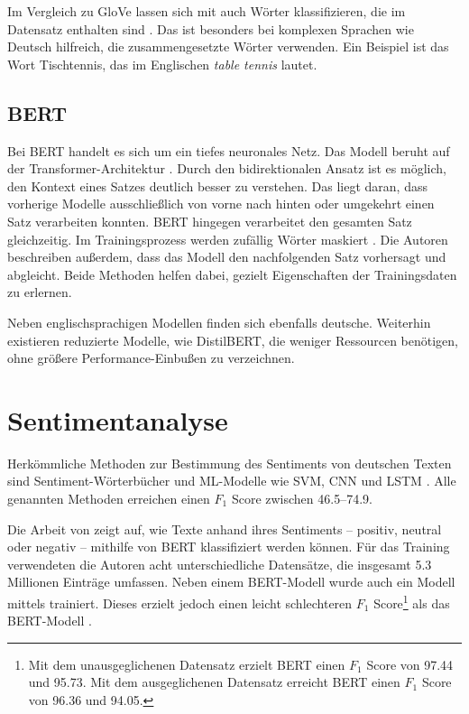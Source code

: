 Im Vergleich zu \ac{GloVe} lassen sich mit \ft auch Wörter klassifizieren, die im Datensatz enthalten sind \autocite{guhr_training_2020, bojanowski_enriching_2017}. Das ist besonders bei komplexen Sprachen wie Deutsch hilfreich, die zusammengesetzte Wörter verwenden. Ein Beispiel ist das Wort Tischtennis, das im Englischen \textit{table tennis} lautet.

\subsection*{BERT}

Bei \ac{BERT} handelt es sich um ein tiefes neuronales Netz. Das Modell beruht auf der Transformer-Architektur \autocite[3]{devlin_bert_2019}. Durch den bidirektionalen Ansatz ist es möglich, den Kontext eines Satzes deutlich besser zu verstehen. Das liegt daran, dass vorherige Modelle ausschließlich von vorne nach hinten oder umgekehrt einen Satz verarbeiten konnten. \ac{BERT} hingegen verarbeitet den gesamten Satz gleichzeitig. Im Trainingsprozess werden zufällig Wörter maskiert \autocite[4]{devlin_bert_2019}. Die Autoren beschreiben außerdem, dass das Modell den nachfolgenden Satz vorhersagt und abgleicht. Beide Methoden helfen dabei, gezielt Eigenschaften der Trainingsdaten zu erlernen.

Neben englischsprachigen Modellen finden sich ebenfalls deutsche. Weiterhin existieren reduzierte Modelle, wie DistilBERT, die weniger Ressourcen benötigen, ohne größere Performance-Einbußen zu verzeichnen.

\section{Sentimentanalyse} \label{sec:sentimentanalysis}

Herkömmliche Methoden zur Bestimmung des Sentiments von deutschen Texten sind Sentiment-Wörterbücher und \ac{ML}-Modelle wie \ac{SVM}, \ac{CNN} und \ac{LSTM} \autocite[1627\psq]{guhr_training_2020}. Alle genannten Methoden erreichen einen $F_1$ Score zwischen \numrange{46.5}{74.9}.

Die Arbeit von \textcite{guhr_training_2020} zeigt auf, wie Texte anhand ihres Sentiments -- positiv, neutral oder negativ -- mithilfe von \ac{BERT} klassifiziert werden können. Für das Training verwendeten die Autoren acht unterschiedliche Datensätze, die insgesamt \num{5.3} Millionen Einträge umfassen. Neben einem \ac{BERT}-Modell wurde auch ein Modell mittels \ft trainiert. Dieses erzielt jedoch einen leicht schlechteren $F_1$ Score\footnote{Mit dem unausgeglichenen Datensatz erzielt \ac{BERT} einen $F_1$ Score von \num{97.44} und \ft \num{95.73}. Mit dem ausgeglichenen Datensatz erreicht \ac{BERT} einen $F_1$ Score von \num{96.36} und \ft \num{94.05}.} als das \ac{BERT}-Modell \autocite[]{guhr_training_2020}.

